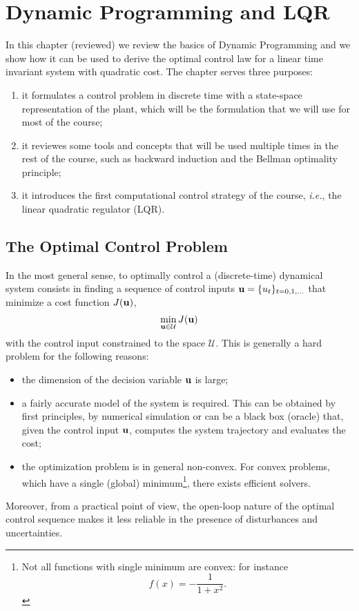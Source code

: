 \chapter{Dynamic Programming and LQR}
\label{sec:dynamic-programming-lqr}

In this chapter (reviewed) we review the basics of Dynamic Programming and we show how it can be used to derive the optimal control law for a linear time invariant system with quadratic cost. The chapter serves three purposes:
\begin{enumerate}
\item it formulates a control problem in discrete time with a state-space representation of the plant, which will be the formulation that we will use for most of the course;
\item it reviewes some tools and concepts that will be used multiple times in the rest of the course, such as backward induction and the Bellman optimality principle;
\item it introduces the first computational control strategy of the course, \textit{i.e.}, the linear quadratic regulator (LQR).
\end{enumerate}


\section{The Optimal Control Problem}

In the most general sense, to optimally control a (discrete-time) dynamical system consists in finding a sequence of control inputs $\boldsymbol{\mathrm{u}} = \{u_t\}_{t=0,1,\ldots}$ that minimize a cost function $J(\boldsymbol{\mathrm{u}})$,
\begin{equation*}
  \min_{\boldsymbol{\mathrm{u}}\in\mathcal{U}} J(\boldsymbol{\mathrm{u}})
\end{equation*}
with the control input constrained to the space $\mathcal{U}$. This is generally a hard problem for the following reasons:
\begin{itemize}
\item the dimension of the decision variable $\boldsymbol{\mathrm{u}}$ is large;
\item a fairly accurate model of the system is required. This can be obtained by first principles, by numerical simulation or can be a black box (oracle) that, given the control input $\boldsymbol{\mathrm{u}}$, computes the system trajectory and evaluates the cost;
\item the optimization problem is in general non-convex. For convex problems, which have a single (global) minimum\footnote{Not all functions with single minimum are convex: for instance
    \begin{equation*}
      f(x) = -\frac{1}{1+x^2}.
    \end{equation*}}, there exists efficient solvers.
\end{itemize}
Moreover, from a practical point of view, the open-loop nature of the optimal control sequence makes it less reliable in the presence of disturbances and uncertainties.


